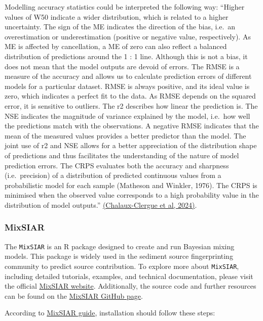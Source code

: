 \documentclass[
]{article}
\begin{document}
Modelling accuracy statistics could be interpreted the following way:
``Higher values of W50 indicate a wider distribution, which is related
to a higher uncertainty. The sign of the ME indicates the direction of
the bias, i.e.~an overestimation or underestimation (positive or
negative value, respectively). As ME is affected by cancellation, a ME
of zero can also reflect a balanced distribution of predictions around
the 1 : 1 line. Although this is not a bias, it does not mean that the
model outputs are devoid of errors. The RMSE is a measure of the
accuracy and allows us to calculate prediction errors of different
models for a particular dataset. RMSE is always positive, and its ideal
value is zero, which indicates a perfect fit to the data. As RMSE
depends on the squared error, it is sensitive to outliers. The r2
describes how linear the prediction is. The NSE indicates the magnitude
of variance explained by the model, i.e.~how well the predictions match
with the observations. A negative RMSE indicates that the mean of the
measured values provides a better predictor than the model. The joint
use of r2 and NSE allows for a better appreciation of the distribution
shape of predictions and thus facilitates the understanding of the
nature of model prediction errors. The CRPS evaluates both the accuracy
and sharpness (i.e.~precision) of a distribution of predicted continuous
values from a probabilistic model for each sample (Matheson and Winkler,
1976). The CRPS is minimised when the observed value corresponds to a
high probability value in the distribution of model outputs.''
\href{10.5194/soil-10-109-2024}{(Chalaux-Clergue et al, 2024)}.

\hypertarget{mixsiar}{%
\subsubsection{MixSIAR}\label{mixsiar}}

The \texttt{MixSIAR} is an R package designed to create and run Bayesian
mixing models. This package is widely used in the sediment source
fingerprinting community to predict source contribution. To explore more
about \texttt{MixSIAR}, including detailed tutorials, examples, and
technical documentation, please visit the official
\href{http://brianstock.github.io/MixSIAR/index.html}{MixSIAR website}.
Additionally, the source code and further resources can be found on the
\href{https://github.com/brianstock/MixSIAR}{MixSIAR GitHub page}.

According to
\href{http://brianstock.github.io/MixSIAR/index.html\#installation}{MixSIAR
guide}, installation should follow these steps:
\end{document}
